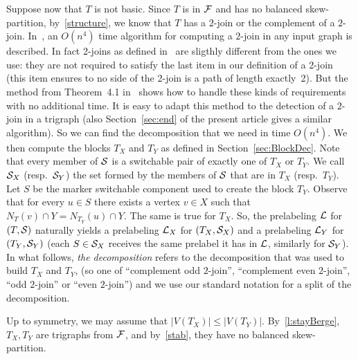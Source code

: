 \documentclass[11 pt] {article}
\begin{document}
Suppose now that $T$ is not basic.  Since $T$ is in $\cal F$ and has
no balanced skew-partition, by~\ref{structure}, we know that $T$ has a
$2$-join or the complement of a $2$-join.  In~\cite{ChHaTrVu:2-join},
an $O(n^4)$ time algorithm for computing a $2$-join in any input graph
is described.  In fact 2-joins as defined in~\cite{ChHaTrVu:2-join}
are sligthly different from the ones we use: they are not required to
satisfy the last item in our definition of a 2-join (this item ensures
to no side of the 2-join is a path of length exactly~2).  But the
method from Theorem~4.1 in~\cite{ChHaTrVu:2-join} shows how to handle
these kinds of requirements  with no additional time.  It is easy to
adapt this method to the detection of a $2$-join in a trigraph (also
Section~\ref{sec:end} of the present article gives a similar
algorithm).  So we can find the decomposition that we need in time
$O(n^4)$. We then compute the blocks $T_X$ and $T_Y$ as defined in
Section~\ref{sec:BlockDec}.  Note that every member of $\cal S$ is a
switchable pair of exactly one of $T_X$ or $T_Y$.  We call ${\cal
  S}_X$ (resp.\ ${\cal S}_Y$) the set formed by the members of $\cal
S$ that are in $T_X$ (resp.\ $T_Y$). Let $S$ be the marker switchable
component used to create the block $T_Y$.  Observe that for every $u
\in S$ there exists a vertex $v \in X$ such that $N_T(v)\cap
Y=N_{T_Y}(u)\cap Y$.  The same is true for $T_X$.  So, the prelabeling
$\cal L$ for $(T, {\cal S})$ naturally yields a prelabeling ${\cal
  L}_X$ for $(T_X, {\cal S}_X)$ and a prelabeling ${\cal L}_Y$ for
$(T_Y, {\cal S}_Y)$ (each $S\in {\cal S}_X$ receives the same prelabel
it has in $\cal L$, similarly for ${\cal S}_Y$).  In what follows,
\emph{the decomposition} refers to the decomposition that was used to
build $T_X$ and $T_Y$, (so one of ``complement odd $2$-join'',
``complement even $2$-join'', ``odd $2$-join'' or ``even $2$-join'')
and we use our standard notation for a split of the decomposition.


Up to symmetry, we may assume that $|V(T_X)|\leq
|V(T_Y)|$. By~\ref{l:stayBerge}, $T_X, T_Y$ are trigraphs from $\cal F$,
and by~\ref{stab}, they have no balanced skew-partition.
\end{document}
